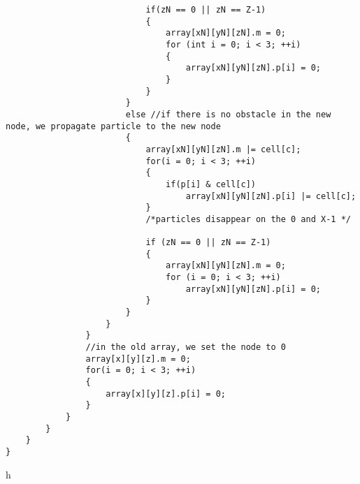 \begin{lstlisting}
							if(zN == 0 || zN == Z-1)
							{
								array[xN][yN][zN].m = 0;
								for (int i = 0; i < 3; ++i)
								{
									array[xN][yN][zN].p[i] = 0;
								}
							}
						}	
						else //if there is no obstacle in the new node, we propagate particle to the new node
						{
							array[xN][yN][zN].m |= cell[c];
							for(i = 0; i < 3; ++i)
							{
								if(p[i] & cell[c])
									array[xN][yN][zN].p[i] |= cell[c];
							}
							/*particles disappear on the 0 and X-1 */
														
							if (zN == 0 || zN == Z-1)
							{
								array[xN][yN][zN].m = 0;
								for (i = 0; i < 3; ++i)
									array[xN][yN][zN].p[i] = 0;
							}
						}
					}
				}
				//in the old array, we set the node to 0
				array[x][y][z].m = 0;
				for(i = 0; i < 3; ++i)
				{
					array[x][y][z].p[i] = 0;
				}
			}
		}
	}
}
\end{lstlisting}h